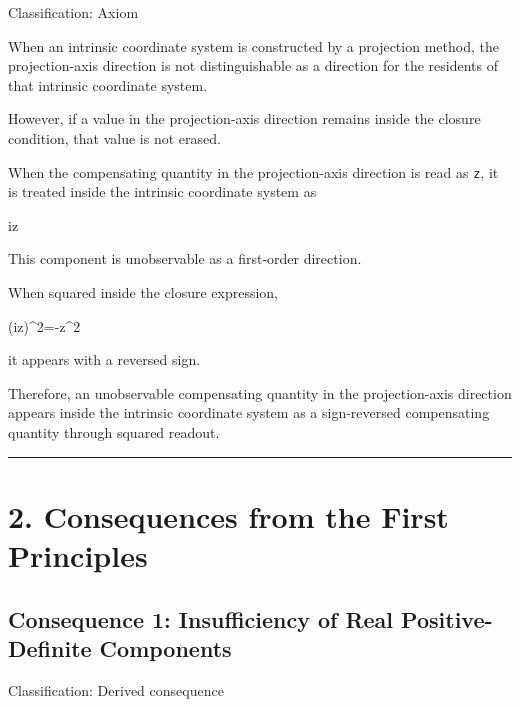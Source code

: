 \documentclass[
  a4paper,
]{article}
\newenvironment{Shaded}{}{}
\newcommand{\NormalTok}[1]{#1}
\begin{document}
Classification: Axiom

When an intrinsic coordinate system is constructed by a projection
method, the projection-axis direction is not distinguishable as a
direction for the residents of that intrinsic coordinate system.

However, if a value in the projection-axis direction remains inside the
closure condition, that value is not erased.

When the compensating quantity in the projection-axis direction is read
as \texttt{z}, it is treated inside the intrinsic coordinate system as

\begin{Shaded}
\begin{Highlighting}[]
\NormalTok{iz}
\end{Highlighting}
\end{Shaded}

This component is unobservable as a first-order direction.

When squared inside the closure expression,

\begin{Shaded}
\begin{Highlighting}[]
\NormalTok{(iz)\^{}2={-}z\^{}2}
\end{Highlighting}
\end{Shaded}

it appears with a reversed sign.

Therefore, an unobservable compensating quantity in the projection-axis
direction appears inside the intrinsic coordinate system as a
sign-reversed compensating quantity through squared readout.

\begin{center}\rule{0.5\linewidth}{0.5pt}\end{center}

\section{2. Consequences from the First
Principles}\label{consequences-from-the-first-principles}

\subsection{Consequence 1: Insufficiency of Real Positive-Definite
Components}\label{consequence-1-insufficiency-of-real-positive-definite-components}

Classification: Derived consequence
\end{document}
